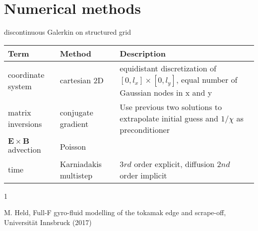 \documentclass{hitec} %
\renewenvironment{thebibliography}[1]{
  \begin{oldthebibliography}{#1}
    \RaggedRight %
    \setlength{\itemsep}{0em}
    \setlength{\parskip}{0em}
}
{
  \end{oldthebibliography}
}
\newcommand{\ExB}{$\bm{E}\times\bm{B} \,$}
\begin{document}
\section{Numerical methods}
discontinuous Galerkin on structured grid 
\begin{longtable}{ll>{\RaggedRight}p{7cm}}
\toprule
\rowcolor{gray!50}\textbf{Term} &  \textbf{Method} & \textbf{Description}  \\ \midrule
coordinate system & cartesian 2D & equidistant discretization of $[0,l_x] \times [0,l_y]$, equal number of Gaussian nodes in x and y \\
matrix inversions & conjugate gradient & Use previous two solutions to extrapolate initial guess and $1/\chi$ as preconditioner \\
\ExB advection & Poisson & \\
time &  Karniadakis multistep & $3rd$ order explicit, diffusion $2nd$ order implicit \\
\bottomrule
\end{longtable}
\begin{thebibliography}{1}
  M. Held, Full-F gyro-fluid modelling of the tokamak edge and scrape-off, Universit{\"a}t Innsbruck (2017)
\end{thebibliography}
\end{document}
